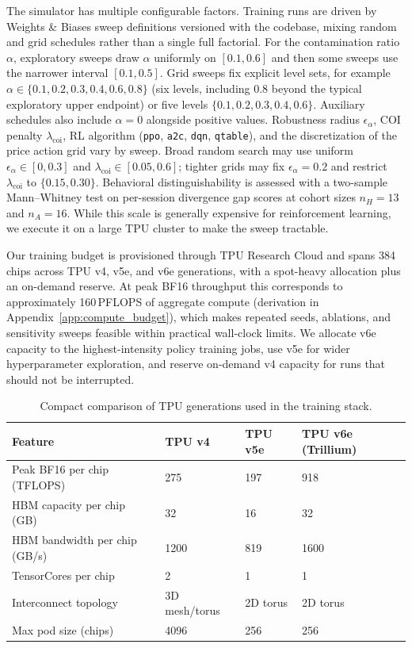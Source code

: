 The simulator has multiple configurable factors. Training runs are driven by Weights \& Biases sweep definitions versioned with the codebase, mixing random and grid schedules rather than a single full factorial. For the contamination ratio $\alpha$, exploratory sweeps draw $\alpha$ uniformly on $[0.1,0.6]$ and then some sweeps use the narrower interval $[0.1,0.5]$. Grid sweeps fix explicit level sets, for example $\alpha\in\{0.1,0.2,0.3,0.4,0.6,0.8\}$ (six levels, including $0.8$ beyond the typical exploratory upper endpoint) or five levels $\{0.1,0.2,0.3,0.4,0.6\}$. Auxiliary schedules also include $\alpha=0$ alongside positive values. Robustness radius $\epsilon_\alpha$, COI penalty $\lambda_\text{coi}$, RL algorithm (\texttt{ppo}, \texttt{a2c}, \texttt{dqn}, \texttt{qtable}), and the discretization of the price action grid vary by sweep. Broad random search may use uniform $\epsilon_\alpha\in[0,0.3]$ and $\lambda_\text{coi}\in[0.05,0.6]$; tighter grids may fix $\epsilon_\alpha=0.2$ and restrict $\lambda_\text{coi}$ to $\{0.15,0.30\}$. Behavioral distinguishability is assessed with a two-sample Mann--Whitney test on per-session divergence gap scores at cohort sizes $n_H=13$ and $n_A=16$.
While this scale is generally expensive for reinforcement learning, we execute it on a large TPU cluster to make the sweep tractable.

Our training budget is provisioned through TPU Research Cloud and spans 384 chips across TPU v4, v5e, and v6e generations, with a spot-heavy allocation plus an on-demand reserve. At peak BF16 throughput this corresponds to approximately 160\,PFLOPS of aggregate compute (derivation in Appendix~\ref{app:compute_budget}), which makes repeated seeds, ablations, and sensitivity sweeps feasible within practical wall-clock limits. We allocate v6e capacity to the highest-intensity policy training jobs, use v5e for wider hyperparameter exploration, and reserve on-demand v4 capacity for runs that should not be interrupted.

\begin{table}[ht]
\centering
\caption{Compact comparison of TPU generations used in the training stack.}
\label{tab:tpu_specs}
\begin{tabular}{@{}llll@{}}
\toprule
\textbf{Feature} & \textbf{TPU v4} & \textbf{TPU v5e} & \textbf{TPU v6e (Trillium)} \\
\midrule
Peak BF16 per chip (TFLOPS) & 275 & 197 & 918 \\
HBM capacity per chip (GB) & 32 & 16 & 32 \\
HBM bandwidth per chip (GB/s) & 1200 & 819 & 1600 \\
TensorCores per chip & 2 & 1 & 1 \\
Interconnect topology & 3D mesh/torus & 2D torus & 2D torus \\
Max pod size (chips) & 4096 & 256 & 256 \\
\bottomrule
\end{tabular}
\end{table}

